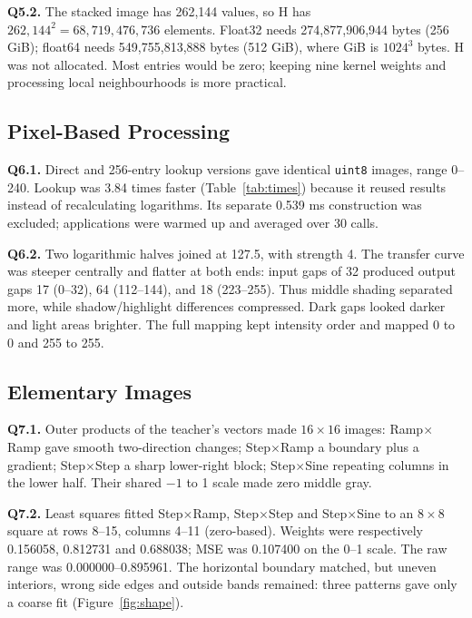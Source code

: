 \documentclass[10pt,a4paper]{article}
\begin{document}
\textbf{Q5.2.} The stacked image has 262,144 values, so H has
\(262{,}144^2=68{,}719{,}476{,}736\) elements. Float32 needs
274,877,906,944 bytes (256 GiB); float64 needs 549,755,813,888 bytes (512 GiB),
where GiB is \(1024^3\) bytes. H was not allocated. Most entries would be zero;
keeping nine kernel weights and processing local neighbourhoods is more practical.

\subsection{Pixel-Based Processing}
\textbf{Q6.1.} Direct and 256-entry lookup versions gave identical
\texttt{uint8} images, range 0--240. Lookup was 3.84 times faster
(Table~\ref{tab:times}) because it reused results instead of recalculating
logarithms. Its separate 0.539 ms construction was excluded; applications
were warmed up and averaged over 30 calls.

\textbf{Q6.2.} Two logarithmic halves joined at 127.5, with strength 4.
The transfer curve was steeper centrally and flatter at both ends: input gaps
of 32 produced output gaps 17 (0--32), 64 (112--144), and 18 (223--255).
Thus middle shading separated more, while shadow/highlight differences
compressed. Dark gaps looked darker and light areas brighter. The full
mapping kept intensity order and mapped 0 to 0 and 255 to 255.

\subsection{Elementary Images}
\textbf{Q7.1.} Outer products of the teacher's vectors made \(16\times16\)
images: Ramp\(\times\)Ramp gave smooth two-direction changes;
Step\(\times\)Ramp a boundary plus a gradient; Step\(\times\)Step a sharp
lower-right block; Step\(\times\)Sine repeating columns in the lower half.
Their shared \(-1\) to 1 scale made zero middle gray.

\textbf{Q7.2.} Least squares fitted Step\(\times\)Ramp, Step\(\times\)Step and
Step\(\times\)Sine to an \(8\times8\) square at rows 8--15, columns 4--11
(zero-based). Weights were respectively 0.156058, 0.812731 and 0.688038;
MSE was 0.107400 on the 0--1 scale. The raw range was 0.000000--0.895961.
The horizontal boundary matched, but uneven interiors, wrong side edges and
outside bands remained: three patterns gave only a coarse fit (Figure~\ref{fig:shape}).
\end{document}
